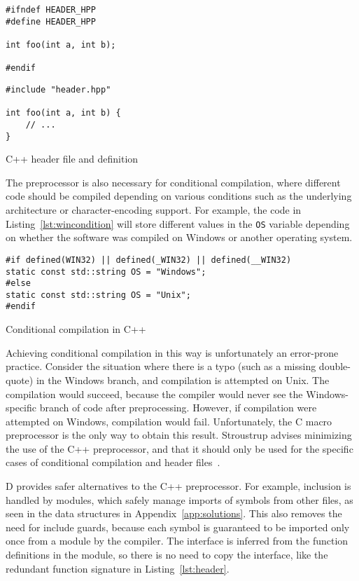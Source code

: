 \documentclass[finalcopy]{srpaper}
\begin{document}
\begin{listing}[H]
\begin{verbatim}
#ifndef HEADER_HPP
#define HEADER_HPP

int foo(int a, int b);

#endif
\end{verbatim}
\begin{verbatim}
#include "header.hpp"

int foo(int a, int b) {
    // ...
}
\end{verbatim}
\caption{C++ header file and definition}
\label{lst:header}
\end{listing}

The preprocessor is also necessary for conditional compilation, where different
code should be compiled depending on various conditions such as the underlying
architecture or character-encoding support. For example, the code in
Listing~\ref{lst:wincondition} will store different values in the \texttt{OS}
variable depending on whether the software was compiled on Windows or another
operating system.

\begin{listing}[H]
\begin{verbatim}
#if defined(WIN32) || defined(_WIN32) || defined(__WIN32)
static const std::string OS = "Windows";
#else
static const std::string OS = "Unix";
#endif
\end{verbatim}
\caption{Conditional compilation in C++}
\label{lst:wincondition}
\end{listing}

Achieving conditional compilation in this way is unfortunately an error-prone
practice. Consider the situation where there is a typo (such as a missing
double-quote) in the Windows branch, and compilation is attempted on Unix. The
compilation would succeed, because the compiler would never see the
Windows-specific branch of code after preprocessing. However, if compilation
were attempted on Windows, compilation would fail. Unfortunately, the C macro
preprocessor is the only way to obtain this result. Stroustrup advises
minimizing the use of the C++ preprocessor, and that it should only be used for
the specific cases of conditional compilation and header
files~\cite{stroustrup2013the}.

D provides safer alternatives to the C++ preprocessor. For example, inclusion
is handled by modules, which safely manage imports of symbols from other files,
as seen in the data structures in Appendix~\ref{app:solutions}. This also
removes the need for include guards, because each symbol is guaranteed to be
imported only once from a module by the compiler. The interface is inferred
from the function definitions in the module, so there is no need to copy the
interface, like the redundant function signature in Listing~\ref{lst:header}.
\end{document}
